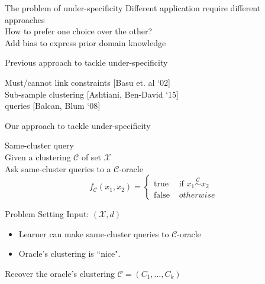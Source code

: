 \documentclass{beamer}
\newcommand{\mc}{\mathcal}
\begin{document}
\begin{frame}{The problem of under-specificity}
	Different application require different approaches\\
	\vspace{1cm} How to prefer one choice over the other?\\
	\vspace{1.5cm} Add {\color{blue} bias} to express {\color{blue} prior domain knowledge}
\end{frame}

\begin{frame}{Previous approach to tackle under-specificity}
	
	{\color{blue}Must/cannot} link constraints \alert{[Basu et. al `02]}\\
	\vspace{1cm}Sub-sample clustering \alert{[Ashtiani, Ben-David `15]}\\
	 queries \alert{[Balcan, Blum `08]}
\end{frame}

\begin{frame}{Our approach to tackle under-specificity}
	
	{\color{blue}Same-cluster query}\\
    \vspace{1cm}Given a clustering $\mc C$ of set $\mc X$\\
    \vspace{0.51cm}Ask same-cluster queries to a ${\mc C}$-oracle\\
    $$f_{\mc C}(x_1, x_2) = \left\{
	\begin{array}{ll}
		\mbox{true }  & \mbox{if } x_1 \overset{\mc C}{\sim} x_2   \\
		\mbox{false } & otherwise 
	\end{array}
\right. $$
\end{frame}

\begin{frame}{Problem Setting}
	Input: $(\mc X, d)$
	\begin{itemize} 
   		\vspace{0.4cm}\item Learner can make same-cluster queries to $\mc C$-oracle
		\vspace{0.4cm}\item Oracle's clustering is ``nice".     
	\end{itemize}
	\vspace{1.4cm} Recover the oracle's clustering $\mc C=(C_1, \ldots, C_k)$
\end{frame}
\end{document}
